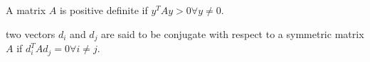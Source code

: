 A matrix $A$ is positive definite if $y^T A y > 0 \forall y \neq 0$.

two vectors $d_i$ and $d_j$ are said to be
conjugate with respect to a symmetric matrix $A$ if $d_i^T Ad_j = 0 \forall i \neq j$.